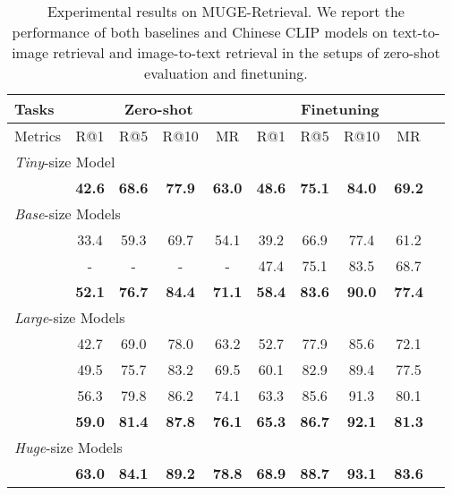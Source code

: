 \documentclass[11pt]{article}
\begin{document}
 
\begin{table*}[t]
\center
\small
\vskip 0.15in
\begin{adjustbox}{max width=1.\textwidth}
\begin{tabular}{@{\extracolsep{\fill}}lccccccccc}
\toprule
  Tasks
  &\multicolumn{4}{c}{Zero-shot}
&\multicolumn{4}{c}{Finetuning}
  \\
\midrule
  Metrics & R@1 & R@5 & R@10 & MR & R@1 & R@5 & R@10 & MR
  \\
\midrule
    \multicolumn{9}{l}{\textit{Tiny}-size Model} \\
    
    & \textbf{42.6}	& \textbf{68.6}	& \textbf{77.9}	& \textbf{63.0}	& \textbf{48.6}	& \textbf{75.1}	& \textbf{84.0}	& \textbf{69.2}
    \\
\midrule
    \multicolumn{9}{l}{\textit{Base}-size Models} \\
    
    & 33.4	& 59.3	& 69.7	& 54.1	& 39.2	& 66.9	& 77.4	& 61.2
    \\
    
    & -	& -	& -	& -	& 47.4	& 75.1	& 83.5	& 68.7
    \\
    
    & \textbf{52.1}	& \textbf{76.7}	& \textbf{84.4}	& \textbf{71.1}	& \textbf{58.4}	& \textbf{83.6}	& \textbf{90.0}	& \textbf{77.4}
    \\
\midrule
    \multicolumn{9}{l}{\textit{Large}-size Models} \\
    
    & 42.7	& 69.0	& 78.0	& 63.2	& 52.7	& 77.9	& 85.6	& 72.1
    \\
    
    & 49.5 	& 75.7 	& 83.2	& 69.5	& 60.1 	& 82.9 	& 89.4 	& 77.5
    \\
    
    & 56.3	& 79.8	& 86.2	& 74.1	& 63.3	& 85.6	& 91.3	& 80.1
    \\
    
    & \textbf{59.0}	& \textbf{81.4}	& \textbf{87.8}	& \textbf{76.1}	& \textbf{65.3}	& \textbf{86.7}	& \textbf{92.1}	& \textbf{81.3}
    \\
\midrule
    \multicolumn{9}{l}{\textit{Huge}-size Models} \\
    
    & \textbf{63.0}	& \textbf{84.1}	& \textbf{89.2}	& \textbf{78.8}	& \textbf{68.9}	& \textbf{88.7}	& \textbf{93.1}	& \textbf{83.6}
    \\
\bottomrule
\end{tabular}
\end{adjustbox}
\caption{Experimental results on MUGE-Retrieval. We report the performance of both baselines and Chinese CLIP models on text-to-image retrieval and image-to-text retrieval in the setups of zero-shot evaluation and finetuning. }
\label{tb:muge}
\end{table*}
\end{document}
